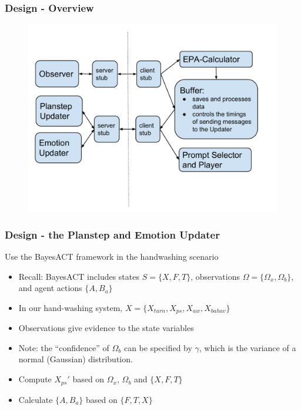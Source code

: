 \documentclass{beamer}
\begin{document}
\begin{frame}
\frametitle{Design - Overview}
\begin{figure}
\centering
\includegraphics[trim = 5mm 15mm 5mm 20mm, clip, width=.8\linewidth]{fig/fig-system-overview.pdf}
\end{figure}
\end{frame}

\begin{frame}
\frametitle{Design - the Planstep and Emotion Updater}
Use the BayesACT framework in the handwashing scenario
\begin{itemize}
\item Recall: BayesACT includes states $S = \{X, F, T\}$, observations $\Omega = \{\Omega_{x}, \Omega_{b}\}$, and agent actions $\{A, B_{a}\}$
\pause \item In our hand-washing system, $X = \{X_{turn}, X_{ps}, X_{aw}, X_{bahav}\}$
\pause \item Observations give evidence to the state variables
\item Note: the ``confidence'' of $\Omega_b$ can be specified by $\gamma$, which is the variance of a normal (Gaussian) distribution.
\pause \item Compute $X_{ps}'$ based on $\Omega_{x}$, $\Omega_{b}$ and $\{X, F, T\}$
\pause \item Calculate $\{A, B_{a}\}$ based on $\{F, T, X\}$
\end{itemize}
\end{frame}
\end{document}
